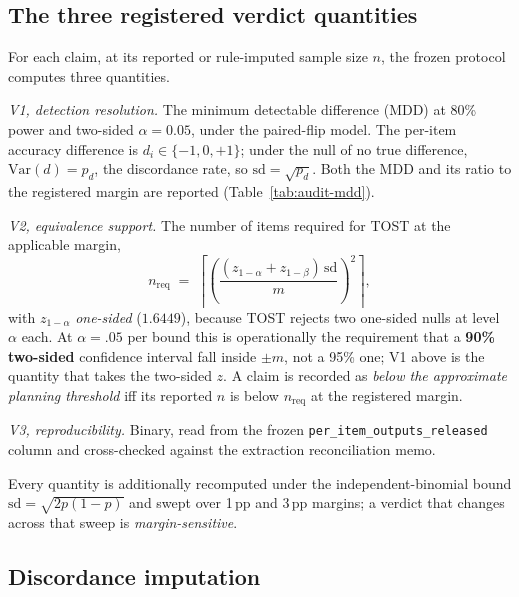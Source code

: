 \subsection{The three registered verdict quantities}
\label{app:audit:verdictrules}

For each claim, at its reported or rule-imputed sample size $n$, the frozen
protocol computes three quantities.

\emph{V1, detection resolution.} The minimum detectable difference (MDD) at 80\%
power and two-sided $\alpha = 0.05$, under the paired-flip model. The per-item
accuracy difference is $d_i \in \{-1, 0, +1\}$; under the null of no true
difference, $\mathrm{Var}(d) = p_d$, the discordance rate, so
$\mathrm{sd} = \sqrt{p_d}$. Both the MDD and its ratio to the registered margin
are reported (Table~\ref{tab:audit-mdd}).

\emph{V2, equivalence support.} The number of items required for TOST at the
applicable margin,
\begin{equation}
n_{\mathrm{req}} \;=\; \left\lceil \left(\frac{(z_{1-\alpha} + z_{1-\beta})\,\mathrm{sd}}{m}\right)^{\!2} \right\rceil ,
\label{eq:tost-n}
\end{equation}
with $z_{1-\alpha}$ \emph{one-sided} ($1.6449$), because TOST rejects two
one-sided nulls at level $\alpha$ each. At $\alpha=.05$ per bound this is
operationally the requirement that a \textbf{90\% two-sided} confidence interval
fall inside $\pm m$, not a 95\% one; V1 above is the quantity that takes the
two-sided $z$. A claim is recorded as \emph{below the approximate planning
threshold} iff its reported $n$ is below $n_{\mathrm{req}}$ at the registered
margin.

\emph{V3, reproducibility.} Binary, read from the frozen
\texttt{per\_item\allowbreak\_outputs\allowbreak\_released} column and
cross-checked against the extraction reconciliation memo.

Every quantity is additionally recomputed under the independent-binomial bound
$\mathrm{sd} = \sqrt{2p(1-p)}$ and swept over 1\,pp and 3\,pp margins; a verdict
that changes across that sweep is \emph{margin-sensitive}.

\subsection{Discordance imputation}
\label{app:audit:imputation}

